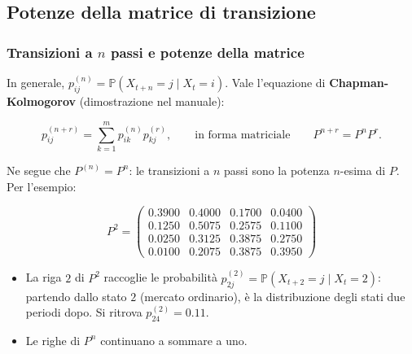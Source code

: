 \documentclass[handout]{beamer}%
\newenvironment{stepitemize}{\begin{itemize}[<+->]}{\end{itemize} }
\providecommand{\Prob}{\mathbb{P}}
\providecommand{\QTR}[2]{\csname #1\endcsname{#2}}
\begin{document}


\subsection{Potenze della matrice di transizione}%

\begin{frame}%
%

\frametitle{Transizioni a $n$ passi e potenze della matrice}%
%

%


In generale, $p_{ij}^{(n)}=\Prob(X_{t+n}=j\mid X_{t}=i)$. Vale l'equazione di
\textbf{Chapman-Kolmogorov} (dimostrazione nel manuale):%

\[
p_{ij}^{(n+r)} = \sum_{k=1}^{m} p_{ik}^{(n)}p_{kj}^{(r)}, \qquad\text{in forma
matriciale} \qquad P^{n+r}=P^{n}P^{r}.
\]


Ne segue che $P^{(n)}=P^{n}$: le transizioni a $n$ passi sono la potenza
$n$-esima di $P$. Per l'esempio:%

\[
P^{2} =
\begin{pmatrix}
0.3900 & 0.4000 & 0.1700 & 0.0400\\
0.1250 & 0.5075 & 0.2575 & 0.1100\\
0.0250 & 0.3125 & 0.3875 & 0.2750\\
0.0100 & 0.2075 & 0.3875 & 0.3950
\end{pmatrix}
\]


\begin{stepitemize}
\item La riga $2$ di $P^{2}$ raccoglie le probabilit\`{a} $p_{2j}%
^{(2)}=\Prob(X_{t+2}=j\mid X_{t}=2)$: partendo dallo stato $2$ (mercato
ordinario), \`{e} la distribuzione degli stati due periodi dopo. Si ritrova
$p_{24}^{(2)}=0.11$.

\item Le righe di $P^{n}$ continuano a sommare a uno.
\end{stepitemize}%

\transboxout
\end{frame}%
\end{document}
